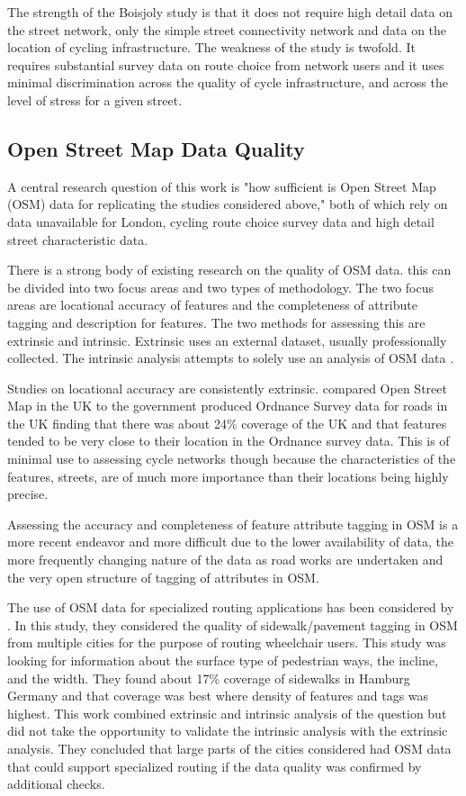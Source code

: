 The strength of the Boisjoly study is that it does not require high detail data on the street network, only the simple street connectivity network and data on the location of cycling infrastructure. The weakness of the study is twofold. It requires substantial survey data on route choice from network users and it uses minimal discrimination across the quality of cycle infrastructure, and across the level of stress for a given street. 

\subsection{Open Street Map Data Quality}

A central research question of this work is "how sufficient is Open Street Map (OSM) data for replicating the studies considered above," both of which rely on data unavailable for London, cycling route choice survey data and high detail street characteristic data. 

There is a strong body of existing research on the quality of OSM data. this can be divided into two focus areas and two types of methodology. The two focus areas are locational accuracy of features and the completeness of attribute tagging and description for features. The two methods for assessing this are extrinsic and intrinsic. Extrinsic uses an external dataset, usually professionally collected. The intrinsic analysis attempts to solely use an analysis of OSM data . 

Studies on locational accuracy are consistently extrinsic. \cite{haklay2010good} compared Open Street Map in the UK to the government produced Ordnance Survey data for roads in the UK finding that there was about 24\% coverage of the UK and that features tended to be very close to their location in the Ordnance survey data. This is of minimal use to assessing cycle networks though because the characteristics of the features, streets, are of much more importance than their locations being highly precise. 

Assessing the accuracy and completeness of feature attribute tagging in OSM is a more recent endeavor and more difficult due to the lower availability of data, the more frequently changing nature of the data as road works are undertaken and the very open structure of tagging of attributes in OSM.  

The use of OSM data for specialized routing applications has been considered by \cite{mobasheri2017crowdsourced}. In this study, they considered the quality of sidewalk/pavement tagging in OSM from multiple cities for the purpose of routing wheelchair users. This study was looking for information about the surface type of pedestrian ways, the incline, and the width. They found about 17\% coverage of sidewalks in Hamburg Germany and that coverage was best where density of features and tags was highest. This work combined extrinsic and intrinsic analysis of the question but did not take the opportunity to validate the intrinsic analysis with the extrinsic analysis. They concluded that large parts of the cities considered had OSM data that could support specialized routing if the data quality was confirmed by additional checks. 

